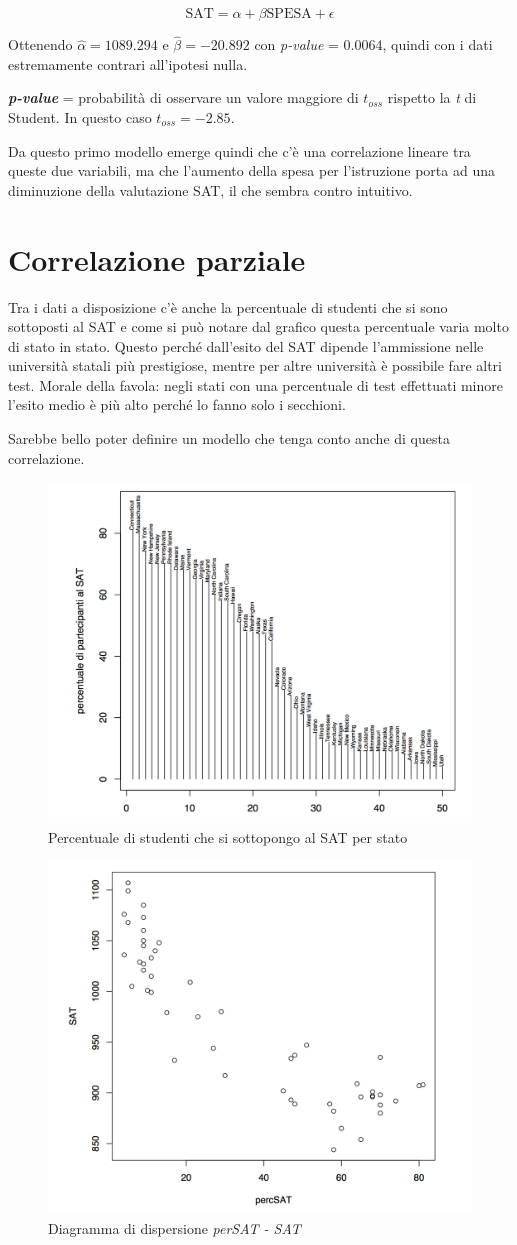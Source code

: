 $$
\text{SAT} = \alpha + \beta \text{SPESA} + \epsilon
$$

Ottenendo $ \hat{\alpha} = 1089.294 $ e $ \hat{\beta} = -20.892 $ con \textit{p-value} = 0.0064, quindi con i dati estremamente contrari all'ipotesi nulla.

\textbf{\textit{p-value}} = probabilità di osservare un valore maggiore di $ t_{oss} $ rispetto la \textit{t} di Student. In questo caso $ t_{oss} = -2.85 $.

Da questo primo modello emerge quindi che c'è una correlazione lineare tra queste due variabili, ma che l'aumento della spesa per l'istruzione porta ad una diminuzione della valutazione SAT, il che sembra contro intuitivo.

\section{Correlazione parziale}

Tra i dati a disposizione c'è anche la percentuale di studenti che si sono sottoposti al SAT e come si può notare dal grafico questa percentuale varia molto di stato in stato.
Questo perché dall'esito del SAT dipende l'ammissione nelle università statali più prestigiose, mentre per altre università è possibile fare altri test.
Morale della favola: negli stati con una percentuale di test effettuati minore l'esito medio è più alto perché lo fanno solo i secchioni.

Sarebbe bello poter definire un modello che tenga conto anche di questa correlazione.

\begin{figure}[htbp]
	\centering
	\includegraphics[width=.5\textwidth]{./notes/immagini/l8-fig5.png}
	\caption{Percentuale di studenti che si sottopongo al SAT per stato}
\end{figure}

\begin{figure}[htbp]
	\centering
	\includegraphics[width=.5\textwidth]{./notes/immagini/l8-fig6.png}
	\caption{Diagramma di dispersione \textit{perSAT - SAT}}
\end{figure}

